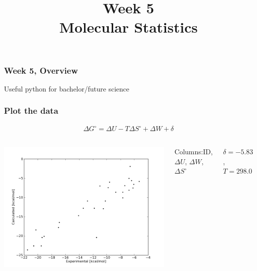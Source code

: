 

\usepackage{soul}

\title[]{Week 5\\Molecular Statistics}








{
\usebackgroundtemplate{}
\begin{frame}[plain]
    \titlepage
    \addtocounter{framenumber}{-1}
\end{frame}
}

\begin{frame}[fragile]

    \frametitle{Week 5, Overview}

    Useful python for bachelor/future science

\end{frame}


\begin{frame}[fragile]

    \frametitle{Plot the data}

    \begin{align*}
        \Delta G^\circ = \Delta U - T \Delta S^\circ + \Delta W + \delta
    \end{align*}

    \begin{columns}[t]


            \includegraphics[width=1.1\textwidth]{images/binding_energy.png}


            Columns:\newline ID, $\Delta U$, $\Delta W$, $\Delta S^\circ$\newline

            $\delta = -5.83$, $T = 298.0$

    \end{columns}

\end{frame}


